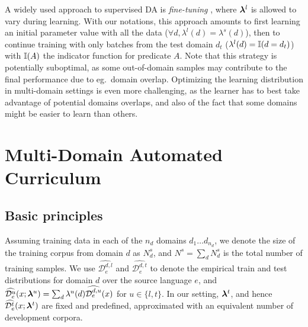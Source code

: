 A widely used approach to supervised DA is \emph{fine-tuning} \citep{Luong15stanford,Freitag16fast}, where $\bm{\lambda}^{l}$ is allowed to vary during learning. With our notations, this approach amounts to first learning an initial parameter value with all the data ($\forall d, \lambda^{l}(d) = \lambda^{s}(d)$), then to continue training with only batches from the test domain $d_t$ ($\lambda^{l}(d) = \mathbb{I}(d = d_t)$) with $\mathbb{I}(A)$ the indicator function for predicate $A$. Note that this strategy is potentially suboptimal, as some out-of-domain samples may contribute to the final performance due to eg.\ domain overlap. Optimizing the learning distribution in multi-domain settings is even more challenging, as the learner has to best take advantage of potential domains overlaps, and also of the fact that some domains might be easier to learn than others.

\section{Multi-Domain Automated Curriculum } \label{sec:mdac-chap7}
\subsection{Basic principles}
Assuming training data in each of the $n_d$ domains $d_1 \dots d_{n_d}$, we denote the size of the training corpus from domain $d$ as $N^{s}_d$, and $N^{s} = \sum_d N^{s}_d$ is the total number of training samples. We use $\widehat{\mathcal{D}^{d,l}_e}$ and $\widehat{\mathcal{D}^{d,t}_e}$ to denote the empirical train and test distributions for domain $d$ over the source language $e$, and $\widehat{\mathcal{D}^u_e}(x;\bm{\lambda}^{u}) = \sum_{d} \lambda^{u}(d) \widehat{\mathcal{D}^{d,u}_e}(x)$ for $u\in\{l,t\}$. In our setting,  $\bm{\lambda}^t$, and hence $\widehat{\mathcal{D}^t_e}(x;\bm{\lambda}^t)$ are fixed and predefined, approximated with an equivalent number of development corpora. 

